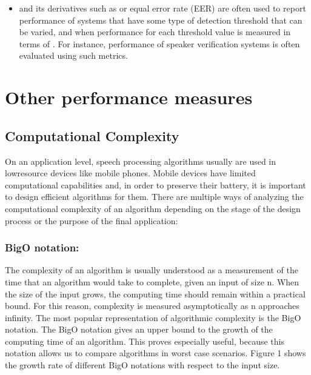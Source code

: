 \documentclass[letterpaper,10pt,english]{jupyterBook}
\begin{document}
\begin{itemize}
\item {} 
\sphinxAtStartPar
{}
and its derivatives such as 
or equal error rate (EER) are often used to report performance of
systems that have some type of detection threshold that can be
varied, and when performance for each threshold value is measured in
terms of . For
instance, performance of speaker verification systems is often
evaluated using such metrics.

\end{itemize}

\sphinxstepscope


\section{Other performance measures}
\label{\detokenize{Evaluation/Other_performance_measures:other-performance-measures}}\label{\detokenize{Evaluation/Other_performance_measures::doc}}

\subsection{Computational Complexity}
\label{\detokenize{Evaluation/Other_performance_measures:computational-complexity}}
\sphinxAtStartPar
On an application level, speech processing algorithms usually are used
in low\sphinxhyphen{}resource devices like mobile phones. Mobile devices have limited
computational capabilities and, in order to preserve their battery, it
is important to design efficient algorithms for them. There are multiple
ways of analyzing the computational complexity of an algorithm depending
on the stage of the design process or the purpose of the final
application:


\subsubsection{Big\sphinxhyphen{}O notation:}
\label{\detokenize{Evaluation/Other_performance_measures:big-o-notation}}
\sphinxAtStartPar
The complexity of an algorithm is usually understood as a measurement of
the time that an algorithm would take to complete, given an input of
size n. When the size of the input grows, the computing time should
remain within a practical bound. For this reason, complexity is measured
asymptotically as n approaches infinity. The most popular representation
of algorithmic complexity is the Big\sphinxhyphen{}O notation. The Big\sphinxhyphen{}O notation
gives an upper bound to the growth of the computing time of an
algorithm. This proves especially useful, because this notation allows
us to compare algorithms in worst case scenarios. Figure 1 shows the
growth rate of different Big\sphinxhyphen{}O notations with respect to the input size.
\end{document}
